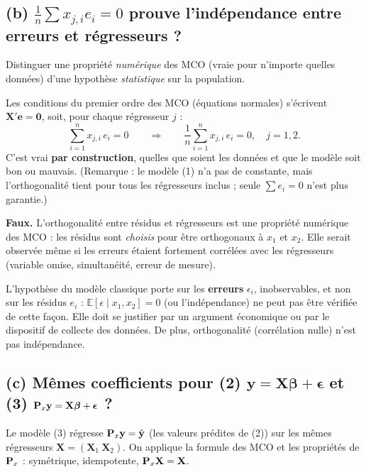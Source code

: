 \documentclass[11pt,a4paper]{article}
\newcommand{\vy}{\mathbf{y}}\newcommand{\vX}{\mathbf{X}}\newcommand{\vZ}{\mathbf{Z}}
\newcommand{\ve}{\mathbf{e}}\newcommand{\vb}{\mathbf{b}}\newcommand{\vx}{\mathbf{x}}
\newcommand{\vbeta}{\bm{\beta}}\newcommand{\veps}{\bm{\epsilon}}\newcommand{\vi}{\bm{\iota}}
\newcommand{\E}{\mathbb{E}}\newcommand{\Var}{\operatorname{Var}}\newcommand{\Cov}{\operatorname{Cov}}
\newcommand{\sumi}{\sum_{i=1}^{n}}
\begin{document}
\subsection*{(b) $\frac1n\sum x_{j,i}e_i=0$ prouve l'indépendance entre erreurs et régresseurs ?}

\begin{idee}
Distinguer une propriété \emph{numérique} des MCO (vraie pour n'importe quelles données) d'une hypothèse \emph{statistique} sur la population.
\end{idee}

Les conditions du premier ordre des MCO (équations normales) s'écrivent $\vX'\ve=\mathbf 0$, soit, pour chaque régresseur $j$ :
\[
\sumi x_{j,i}\,e_i=0\qquad\Longrightarrow\qquad \frac1n\sumi x_{j,i}\,e_i=0,\quad j=1,2 .
\]
C'est vrai \textbf{par construction}, quelles que soient les données et que le modèle soit bon ou mauvais. (Remarque : le modèle (1) n'a pas de constante, mais l'orthogonalité tient pour tous les régresseurs inclus ; seule $\sum e_i=0$ n'est plus garantie.)

\begin{reponse}
\textbf{Faux.} L'orthogonalité entre résidus et régresseurs est une propriété numérique des MCO : les résidus sont \emph{choisis} pour être orthogonaux à $x_1$ et $x_2$. Elle serait observée même si les erreurs étaient fortement corrélées avec les régresseurs (variable omise, simultanéité, erreur de mesure).

L'hypothèse du modèle classique porte sur les \textbf{erreurs} $\epsilon_i$, inobservables, et non sur les résidus $e_i$ : $\E[\epsilon\mid x_1,x_2]=0$ (ou l'indépendance) ne peut pas être vérifiée de cette façon. Elle doit se justifier par un argument économique ou par le dispositif de collecte des données. De plus, orthogonalité (corrélation nulle) n'est pas indépendance.
\end{reponse}

\subsection*{(c) Mêmes coefficients pour (2) $\vy=\vX\vbeta+\veps$ et (3) $\Pm_x\vy=\vX\vbeta+\veps$ ?}

\begin{idee}
Le modèle (3) régresse $\Pm_x\vy=\hat{\vy}$ (les valeurs prédites de (2)) sur les mêmes régresseurs $\vX=(\vX_1\ \vX_2)$. On applique la formule des MCO et les propriétés de $\mathbf{P}_x$ : symétrique, idempotente, $\Pm_x\vX=\vX$.
\end{idee}
\end{document}
